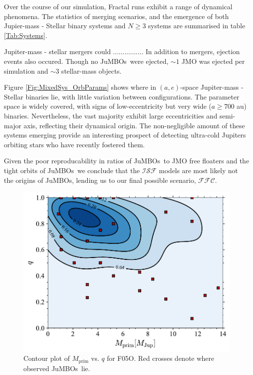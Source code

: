 \documentclass[submission,phys]{lib/SciPost}
\newcommand{\jumbos}{\mbox{JuMBOs}}
\begin{document}
    Over the course of our simulation, Fractal runs exhibit a range of dynamical phenomena. The statistics of merging scenarios, and the emergence of both Jupier-mass - Stellar binary systems and $N\geq3$ systems are summarised in table \ref{Tab:Systems}.

    Jupiter-mass - stellar mergers could ................ In addition to mergers, ejection events also occured. Though no \jumbos\, were ejected, $\sim1$ JMO was ejected per simulation and $\sim 3$ stellar-mass objects.
    
    Figure \ref{Fig:MixedSys_OrbParams} shows where in $(a,e)$-space Jupiter-mass - Stellar binaries lie, with little variation between configurations. The parameter space is widely covered, with signs of low-eccentricity but very wide ($a\geq700$ au) binaries. Nevertheless, the vast majority exhibit large eccentricities and semi-major axis, reflecting their dynamical origin. The non-negligible amount of these systems emerging provide an interesting prospect of detecting ultra-cold Jupiters orbiting stars who have recently fostered them.

    Given the poor reproducability in ratios of \jumbos\, to JMO free floaters and the tight orbits of \jumbos\, we conclude that the $\mathcal{ISF}$ models are most likely not the origins of \jumbos, lending us to our final possible scenario, $\mathcal{FFC}$.

   \begin{figure}
    \centering
        \includegraphics[width=\columnwidth]{figures/Fractal_rvir0.5_Obs_mass_distr.pdf}
        \caption{Contour plot of $M_{\mathrm{prim}}$ vs. $q$ for F05O. Red crosses denote where observed \jumbos\, lie.}
         \label{Fig:FractalObs_mdistr}
   \end{figure}
   
\end{document}
